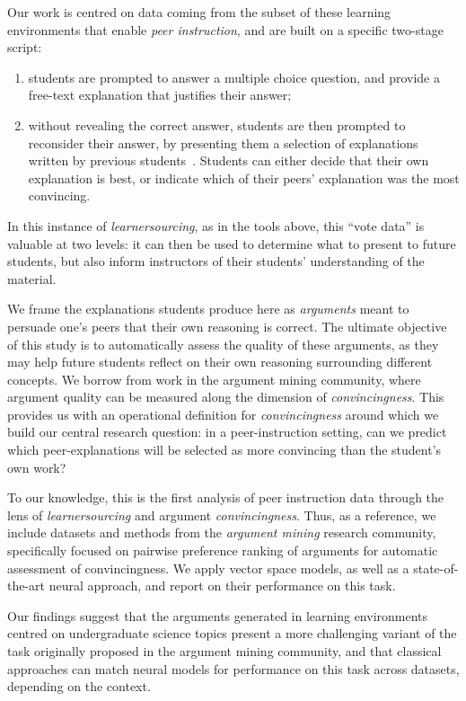 \documentclass[runningheads]{llncs}
\begin{document}
Our work is centred on data coming from the subset of these learning 
environments that enable \textit{peer instruction}\cite{crouch_peer_2001}, and 
are built on a specific two-stage script: 
\begin{enumerate}
	\item students are prompted to answer a multiple choice question, and 
	provide a free-text explanation that justifies their answer;
	\item without revealing the correct answer, students are then prompted to 
	reconsider their answer, by presenting them a selection of explanations 
	written by previous students~\cite{bhatnagar_dalite:_2016}.
	Students can either decide that their own explanation is best, or indicate 
	which of their peers' explanation was the most convincing.
\end{enumerate}
In this instance of \textit{learnersourcing}, as in the tools above, this 
``vote data'' is valuable at two levels: it can then be used to determine what 
to present to future students, but also inform instructors of their students' 
understanding of the material.

We frame the explanations students produce here as \textit{arguments} 
meant to persuade one's peers that their own reasoning is correct.
The ultimate objective of this study is to automatically assess the quality of 
these arguments, as they may help future students reflect on their own 
reasoning surrounding different concepts.
We borrow from work in the argument mining community, where argument quality 
can be measured along the dimension of \textit{convincingness}. 
This provides us with an operational definition for \textit{convincingness} 
around which we build our central research question: in a peer-instruction 
setting, can we predict which peer-explanations will be selected as more 
convincing than the student's own work? 

To our knowledge, this is the first analysis of peer instruction data through 
the lens of \textit{learnersourcing} and argument \textit{convincingness}.
Thus, as a reference, we include datasets and methods from the \textit{argument 
mining} research community, specifically focused on pairwise preference ranking 
of arguments for automatic assessment of convincingness.
We apply vector space models, as well as a state-of-the-art neural approach, 
and report on their performance on this task.

Our findings suggest that the arguments generated in learning environments 
centred on undergraduate science topics present a more challenging variant of 
the task originally proposed in the argument mining community, and that 
classical approaches can match neural models for performance on this task 
across datasets, depending on the context.
\end{document}
